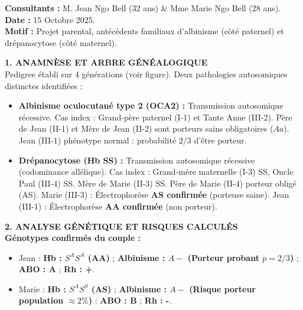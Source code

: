 \documentclass[11pt]{article}
\begin{document}
\begin{exoresolu}
\medskip
\noindent \textbf{Consultants :} M. Jean Ngo Bell (32 ans) \& Mme Marie Ngo Bell (28 ans). \\
\textbf{Date :} 15 Octobre 2025. \\
\textbf{Motif :} Projet parental, antécédents familiaux d'albinisme (côté paternel) et drépanocytose (côté maternel).

\medskip
\noindent \textbf{1. ANAMNÈSE ET ARBRE GÉNÉALOGIQUE} \\
Pedigree établi sur 4 générations (voir figure). Deux pathologies autosomiques distinctes identifiées :
\begin{itemize}
    \item \textbf{Albinisme oculocutané type 2 (OCA2) :} Transmission autosomique récessive. Cas index : Grand-père paternel (I-1) et Tante Anne (III-2). Père de Jean (II-1) et Mère de Jean (II-2) sont porteurs sains obligatoires ($Aa$). Jean (III-1) phénotype normal : probabilité $2/3$ d'être porteur.
    \item \textbf{Drépanocytose (Hb SS) :} Transmission autosomique récessive (codominance allélique). Cas index : Grand-mère maternelle (I-3) SS, Oncle Paul (III-4) SS. Mère de Marie (II-3) SS. Père de Marie (II-4) porteur obligé (AS). Marie (III-3) : Électrophorèse \textbf{AS confirmée} (porteuse saine). Jean (III-1) : Électrophorèse \textbf{AA confirmée} (non porteur).
\end{itemize}

\medskip
\noindent \textbf{2. ANALYSE GÉNÉTIQUE ET RISQUES CALCULÉS} \\
\textbf{Génotypes confirmés du couple :}
\begin{itemize}
    \item Jean : \textbf{Hb : $S^A S^A$ (AA)} ; \textbf{Albinisme : $A-$ (Porteur probant $p=2/3$)} ; \textbf{ABO : A} ; \textbf{Rh : +}.
    \item Marie : \textbf{Hb : $S^A S^S$ (AS)} ; \textbf{Albinisme : $A-$ (Risque porteur population $\approx 2\%$)} ; \textbf{ABO : B} ; \textbf{Rh : -}.
\end{itemize}


\end{exoresolu}
\end{document}
